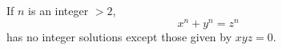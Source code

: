 \begin{proposition}
    If $n$ is an integer $>2$,
\[
    x^n+y^n=z^n
\]
    has no integer solutions except those given by $xyz=0$.
\end{proposition}

